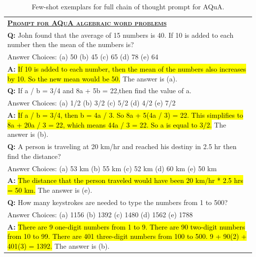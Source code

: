 \documentclass[]{article}
\theoremstyle{plain}
\theoremstyle{definition}
\theoremstyle{remark}
\begin{document}
\begin{table}[H]
    \centering
    \small
    \caption{
    Few-shot exemplars for full chain of thought prompt for AQuA.
    }
    \begin{tabular}{p{\linewidth}}
        \toprule
        \underline{\textbf{\textsc{Prompt for AQuA algebraic word problems}}} \\
        \vspace{-2mm}
        \textbf{Q:} John found that the average of 15 numbers is 40. If 10 is added to each number then the mean of the numbers is? \\ Answer Choices: (a) 50 (b) 45 (c) 65 (d) 78 (e) 64 \\
        \vspace{-1mm}
        \textbf{A:} \hl{If 10 is added to each number, then the mean of the numbers also increases by 10. So the new mean would be 50.} The answer is (a). \\
         \vspace{0mm}
        \textbf{Q:} If a / b = 3/4 and 8a + 5b = 22,then find the value of a. \\ Answer Choices: (a) 1/2 (b) 3/2 (c) 5/2 (d) 4/2 (e) 7/2 \\
        \vspace{-1mm}
        \textbf{A:} \hl{If a / b = 3/4, then b = 4a / 3. So 8a + 5(4a / 3) = 22. This simplifies to 8a + 20a / 3 = 22, which means 44a / 3 = 22. So a is equal to 3/2.} The answer is (b). \\
        \vspace{0mm}
        \textbf{Q:} A person is traveling at 20 km/hr and reached his destiny in 2.5 hr then find the distance? \\ Answer Choices: (a) 53 km (b) 55 km (c) 52 km (d) 60 km (e) 50 km \\
        \vspace{-1mm}
        \textbf{A:} \hl{The distance that the person traveled would have been 20 km/hr * 2.5 hrs = 50 km.}  The answer is (e). \\
        \vspace{0mm}
        \textbf{Q:} How many keystrokes are needed to type the numbers from 1 to 500? \\ Answer Choices: (a) 1156 (b) 1392 (c) 1480 (d) 1562 (e) 1788 \\
        \vspace{-1mm}
        \textbf{A:} \hl{There are 9 one-digit numbers from 1 to 9. There are 90 two-digit numbers from 10 to 99. There are 401 three-digit numbers from 100 to 500. 9 + 90(2) + 401(3) = 1392.} The answer is (b). \\
        \bottomrule
    \end{tabular}
    \label{tab:appendix-aqua-prompt}
\end{table}
\end{document}
